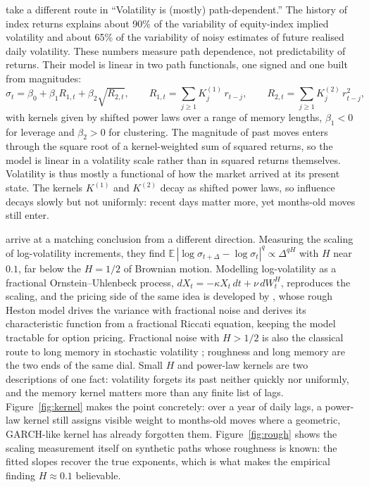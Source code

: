 \documentclass[12pt,a4paper]{article}
\begin{document}
\citet{guyonlekeufack2023} take a different route in ``Volatility is
(mostly) path-dependent.'' The history of index returns explains about
90\% of the variability of equity-index implied volatility and about 65\%
of the variability of noisy estimates of future realised daily volatility.
These numbers measure path dependence, not predictability of returns.
Their model is linear in two path functionals, one signed and one
built from magnitudes:
\begin{equation}
\sigma_t = \beta_0 + \beta_1 R_{1,t} + \beta_2 \sqrt{R_{2,t}},
\qquad
R_{1,t} = \sum_{j \geq 1} K^{(1)}_j\, r_{t-j}, \qquad
R_{2,t} = \sum_{j \geq 1} K^{(2)}_j\, r_{t-j}^2 ,
\end{equation}
with kernels given by shifted power laws over a range of memory lengths,
$\beta_1 < 0$ for leverage and $\beta_2 > 0$ for clustering. The
magnitude of past moves enters through the square root of a
kernel-weighted sum of squared returns, so the model is linear in a
volatility scale rather than in squared returns themselves. Volatility
is thus mostly a functional of how the market arrived at its present
state. The kernels $K^{(1)}$ and $K^{(2)}$ decay as shifted power
laws, so influence decays slowly but not uniformly: recent days matter
more, yet months-old moves still enter.

\citet{gatheral2018} arrive at a matching conclusion from a different
direction. Measuring the scaling of log-volatility increments, they find
$\mathbb{E}\,|\log\sigma_{t+\Delta}-\log\sigma_t|^{q} \propto
\Delta^{qH}$ with $H$ near $0.1$, far below the $H = 1/2$ of Brownian
motion. Modelling log-volatility as a fractional Ornstein--Uhlenbeck
process, $dX_t = -\kappa X_t\,dt + \nu\,dW_t^{H}$, reproduces the
scaling, and the pricing side of the same idea is developed by
\citet{bayer2016}, whose rough Heston model drives the variance with
fractional noise and derives its characteristic function from a
fractional Riccati equation, keeping the model tractable for option
pricing. Fractional noise with $H > 1/2$ is also the classical
route to long memory in stochastic volatility
\citep{comterenault1998}; roughness and long memory are the two ends of
the same dial. Small $H$ and power-law kernels are two descriptions of
one fact: volatility forgets its past neither quickly nor uniformly, and
the memory kernel matters more than any finite list of lags.
Figure~\ref{fig:kernel} makes the point concretely: over a year of daily
lags, a power-law kernel still assigns visible weight to months-old
moves where a geometric, GARCH-like kernel has already forgotten them.
Figure~\ref{fig:rough} shows the scaling measurement itself on synthetic
paths whose roughness is known: the fitted slopes recover the true
exponents, which is what makes the empirical finding $H \approx 0.1$
believable.
\end{document}
